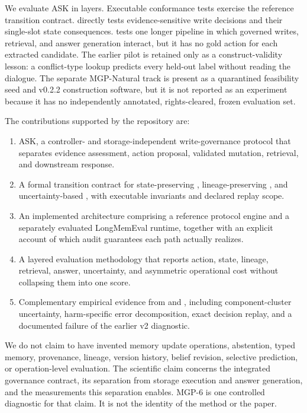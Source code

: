 We evaluate ASK in layers. Executable conformance tests exercise the reference
transition contract. \mgpc{} directly tests evidence-sensitive write decisions
and their single-slot state consequences. \lme{} tests one longer pipeline in
which governed writes, retrieval, and answer generation interact, but it has no
gold action for each extracted candidate. The earlier \mgp{} pilot is retained
only as a construct-validity lesson: a conflict-type lookup predicts every
held-out label without reading the dialogue. The separate MGP-Natural track is
present as a quarantined feasibility seed and v0.2.2 construction software, but
it is not reported as an experiment because it has no independently annotated,
rights-cleared, frozen evaluation set.

The contributions supported by the repository are:
\begin{enumerate}[leftmargin=1.5em,topsep=2pt,itemsep=2pt]
\item ASK, a controller- and storage-independent write-governance protocol that
separates evidence assessment, action proposal, validated mutation, retrieval,
and downstream response.
\item A formal transition contract for state-preserving \keep,
lineage-preserving \supersede, and uncertainty-based \abstain, with executable
invariants and declared replay scope.
\item An implemented architecture comprising a reference protocol engine and a
separately evaluated LongMemEval runtime, together with an explicit account of
which audit guarantees each path actually realizes.
\item A layered evaluation methodology that reports action, state, lineage,
retrieval, answer, uncertainty, and asymmetric operational cost without
collapsing them into one score.
\item Complementary empirical evidence from \mgpc{} and \lme{}, including
component-cluster uncertainty, harm-specific error decomposition, exact
decision replay, and a documented failure of the earlier v2 diagnostic.
\end{enumerate}

We do not claim to have invented memory update operations, abstention, typed
memory, provenance, lineage, version history, belief revision, selective
prediction, or operation-level evaluation. The scientific claim concerns the
integrated governance contract, its separation from storage execution and
answer generation, and the measurements this separation enables. MGP-6 is one
controlled diagnostic for that claim. It is not the identity of the method or
the paper.
